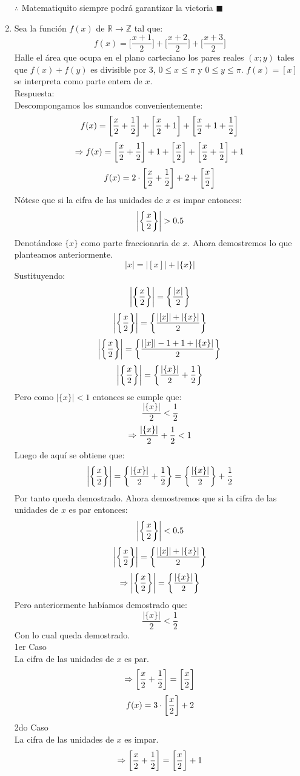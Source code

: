 \documentclass{book}
\newcommand{\R}{\mathbb{R}} \newcommand{\N}{\mathbb{N}}
\newcommand{\Z}{\mathbb{Z}} \def\max{\mathop{\mbox{\rm máx}}} %
\begin{document}
\begin{enumerate}
			$\therefore$ Matematiquito siempre podrá garantizar la victoria $\blacksquare$\\
			\item  Sea la función $f(x)$ de $\R\rightarrow\Z$ tal que: 
			$$f(x)=\bigg[\frac{x+1}{2}\bigg]+\bigg[\frac{x+2}{2}\bigg]+\bigg[\frac{x+3}{2}\bigg]$$
			Halle el área que ocupa en el plano carteciano los pares reales $(x;y)$ tales que $f(x)+f(y)$ es divisible por 3, $0\leq x\leq\pi$ y $0\leq y\leq \pi$. 
$f(x)=[x]$ se interpreta como parte entera de $x$.\\
			Respuesta:\\
			Descompongamos los sumandos convenientemente:
				$$f(x)=\bigg[{x\over 2}+{1\over 2}\bigg]+\bigg[{x\over 2}+1\bigg]+\bigg[{x\over 2}+1+{1\over 2}\bigg]$$
$$\Rightarrow f(x)=\bigg[{x\over 2}+{1\over 2}\bigg]+1+\bigg[{x\over 2}\bigg]+\bigg[{x\over 2}+{1\over 2}\bigg]+1$$
$$f(x)=2\cdot\bigg[{x\over 2}+{1\over 2}\bigg]+2+\bigg[{x\over 2}\bigg]$$
Nótese que si la cifra de las unidades de $x$ es impar entonces:
$$\bigg|\bigg\{{x\over 2}\bigg\}\bigg|>0.5$$
Denotándose $\{x\}$ como parte fraccionaria de $x$. Ahora demostremos lo que planteamos anteriormente. 
$$|x|=|[x]|+|\{x\}|$$
Sustituyendo:
$$\bigg|\bigg\{{x\over 2}\bigg\}\bigg|=\bigg\{{|x|\over 2}\bigg\}$$
$$\bigg|\bigg\{{x\over 2}\bigg\}\bigg|=\bigg\{\frac{|[x]|+|\{x\}|}{2}\bigg\}$$
$$\bigg|\bigg\{{x\over 2}\bigg\}\bigg|=\bigg\{\frac{|[x]|-1+1+|\{x\}|}{2}\bigg\}$$
$$\bigg|\bigg\{{x\over 2}\bigg\}\bigg|=\bigg\{\frac{|\{x\}|}{2}+{1\over 2}\bigg\}$$
Pero como $|\{x\}|<1$ entonces se cumple que:
$$\frac{|\{x\}|}{2}<\frac{1}{2}$$
$$\Rightarrow {|\{x\}|\over 2}+{1\over 2}<1$$
Luego de aquí se obtiene que:
$$\bigg|\bigg\{{x\over 2}\bigg\}\bigg|=\bigg\{\frac{|\{x\}|}{2}+{1\over 2}\bigg\}=\bigg\{\frac{|\{x\}|}{2}\bigg\}+{1\over 2}$$
Por tanto queda demostrado. Ahora demostremos que si la cifra de las unidades de $x$ es par entonces:
$$\bigg|\bigg\{{x\over 2}\bigg\}\bigg|<0.5$$
$$\bigg|\bigg\{{x\over 2}\bigg\}\bigg|=\bigg\{\frac{|[x]|+|\{x\}|}{2}\bigg\}$$
$$\Rightarrow \bigg|\bigg\{{x\over 2}\bigg\}\bigg|=\bigg\{{|\{x\}|\over 2}\bigg\}$$
Pero anteriormente habíamos demostrado que:
$$\frac{|\{x\}|}{2}<\frac{1}{2}$$
Con lo cual queda demostrado.\\
1er Caso \\
La cifra de las unidades de $x$ es par.
$$\Rightarrow\bigg[{x\over 2}+{1\over 2}\bigg]=\bigg[{x\over 2}\bigg]$$
$$f(x)=3\cdot\bigg[{x\over 2}\bigg]+2$$
2do Caso\\
La cifra de las unidades de $x$ es impar.
$$\Rightarrow\bigg[{x\over 2}+{1\over 2}\bigg]=\bigg[{x\over 2}\bigg]+1$$

\end{enumerate}
\end{document}
